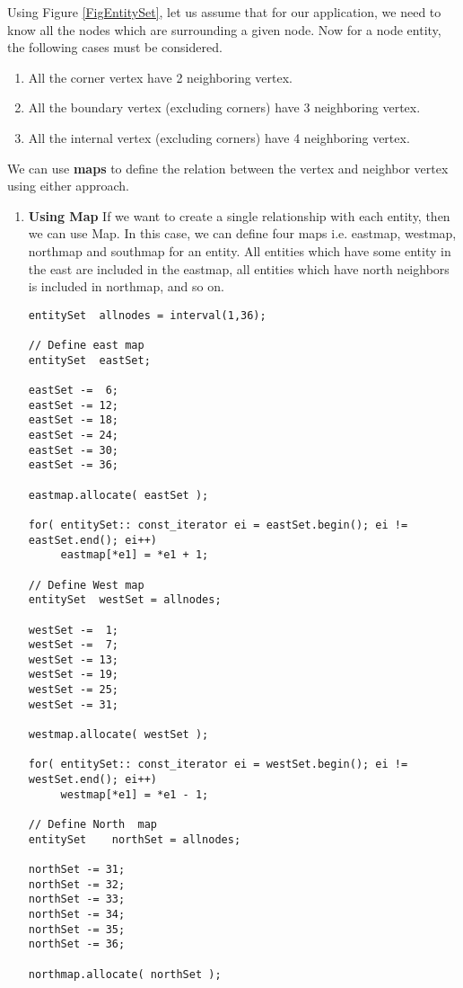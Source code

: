 %
Using Figure \ref{FigEntitySet}, let us assume that for our application,
we need to know all the nodes which are surrounding a given node. Now for
a node entity, the following cases must be considered.
\begin{enumerate}
\item  All the corner vertex have 2 neighboring vertex.
\item  All the boundary vertex (excluding corners) have 3 neighboring vertex.
\item  All the internal vertex (excluding corners) have 4 neighboring vertex.
\end{enumerate}
%
\par We can use {\bf maps} to define the relation between the vertex and
neighbor vertex using either approach.
%
\begin{enumerate}
\item { \bf Using Map }   If we want to create a single relationship with 
each entity, then we can use Map. In this case, we can define four maps
i.e. eastmap, westmap, northmap and southmap for an entity. All entities
which have some entity in the east are included  in the eastmap, all
entities which have north neighbors is included in northmap, and so on.

\begin{verbatim}
entitySet  allnodes = interval(1,36);

// Define east map
entitySet  eastSet;

eastSet -=  6;
eastSet -= 12;
eastSet -= 18;
eastSet -= 24;
eastSet -= 30;
eastSet -= 36;

eastmap.allocate( eastSet );

for( entitySet:: const_iterator ei = eastSet.begin(); ei != eastSet.end(); ei++)
     eastmap[*e1] = *e1 + 1;

// Define West map
entitySet  westSet = allnodes;

westSet -=  1;
westSet -=  7;
westSet -= 13;
westSet -= 19;
westSet -= 25;
westSet -= 31;

westmap.allocate( westSet );

for( entitySet:: const_iterator ei = westSet.begin(); ei != westSet.end(); ei++)
     westmap[*e1] = *e1 - 1;

// Define North  map
entitySet    northSet = allnodes;

northSet -= 31;
northSet -= 32;
northSet -= 33;
northSet -= 34;
northSet -= 35;
northSet -= 36;

northmap.allocate( northSet );


\end{verbatim}
\end{enumerate}
